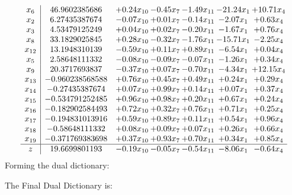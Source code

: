 \documentclass[8pt]{article}
\begin{document}
\[\begin{array}{c| c c@{\hskip 2pt} c@{\hskip 2pt} c@{\hskip 2pt} c@{\hskip 2pt} c@{\hskip 2pt} }
 x_{6}   &  46.9602385686 & +  0.24 x_{10} & -0.45 x_{7} & -1.49 x_{11} & -21.24 x_{1} & + 10.71 x_{4}\\
 x_{2}   &  6.27435387674 & -0.07 x_{10} & +  0.01 x_{7} & -0.14 x_{11} & -2.07 x_{1} & +  0.63 x_{4}\\
 x_{3}   &  4.53479125249 & +  0.04 x_{10} & +  0.02 x_{7} & -0.20 x_{11} & -1.67 x_{1} & +  0.76 x_{4}\\
 x_{8}   &  33.1829025845 & +  0.28 x_{10} & -0.32 x_{7} & -1.76 x_{11} & -15.71 x_{1} & -2.25 x_{4}\\
 x_{12}   &  13.1948310139 & -0.59 x_{10} & +  0.11 x_{7} & +  0.89 x_{11} & -6.54 x_{1} & +  0.04 x_{4}\\
 x_{5}   &  2.58648111332 & -0.08 x_{10} & -0.09 x_{7} & -0.07 x_{11} & -1.26 x_{1} & +  0.34 x_{4}\\
 x_{9}   &  20.3717693837 & -0.37 x_{10} & +  0.07 x_{7} & -0.70 x_{11} & -4.34 x_{1} & + 12.15 x_{4}\\
 x_{13}   &  -0.960238568588 & +  0.76 x_{10} & +  0.45 x_{7} & +  0.49 x_{11} & +  0.24 x_{1} & +  0.29 x_{4}\\
 x_{14}   &  -0.27435387674 & +  0.07 x_{10} & +  0.99 x_{7} & +  0.14 x_{11} & +  0.07 x_{1} & +  0.37 x_{4}\\
 x_{15}   &  -0.534791252485 & +  0.96 x_{10} & +  0.98 x_{7} & +  0.20 x_{11} & +  0.67 x_{1} & +  0.24 x_{4}\\
 x_{16}   &  -0.182902584493 & +  0.72 x_{10} & +  0.32 x_{7} & +  0.76 x_{11} & +  0.71 x_{1} & +  0.25 x_{4}\\
 x_{17}   &  -0.194831013916 & +  0.59 x_{10} & +  0.89 x_{7} & +  0.11 x_{11} & +  0.54 x_{1} & +  0.96 x_{4}\\
 x_{18}   &  -0.58648111332 & +  0.08 x_{10} & +  0.09 x_{7} & +  0.07 x_{11} & +  0.26 x_{1} & +  0.66 x_{4}\\
 x_{19}   &  -0.371769383698 & +  0.37 x_{10} & +  0.93 x_{7} & +  0.70 x_{11} & +  0.34 x_{1} & +  0.85 x_{4}\\
\hline
z    &  19.6699801193 & -0.19 x_{10} & -0.05 x_{7} & -0.54 x_{11} & -8.06 x_{1} & -0.64 x_{4}\\
\end{array}\]
Forming the dual dictionary:

The Final Dual Dictionary is: 
\end{document}
